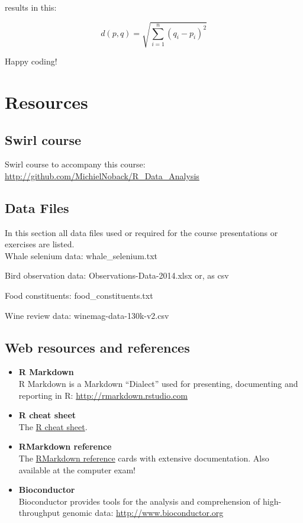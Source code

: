 \documentclass[]{book}
\begin{document}
results in this:

\[d(p, q) = \sqrt{\sum_{i = 1}^{n}(q_i-p_i)^2}\]

Happy coding!

\hypertarget{resources}{%
\section{Resources}\label{resources}}

\hypertarget{swirl-course}{%
\subsection{Swirl course}\label{swirl-course}}

Swirl course to accompany this course: \url{http://github.com/MichielNoback/R_Data_Analysis}

\hypertarget{data-files}{%
\subsection{Data Files}\label{data-files}}

In this section all data files used or required for the course presentations or exercises are listed.\\

Whale selenium data:
whale\_selenium.txt

Bird observation data:
Observations-Data-2014.xlsx or, as
csv

Food constituents:
food\_constituents.txt

Wine review data:
winemag-data-130k-v2.csv

\hypertarget{web-resources-and-references}{%
\subsection{Web resources and references}\label{web-resources-and-references}}

\begin{itemize}
\item
  \textbf{R Markdown}\\
  R Markdown is a Markdown ``Dialect'' used for presenting, documenting and reporting in R: \href{http://rmarkdown.rstudio.com/}{http://rmarkdown.rstudio.com}
\item
  \textbf{R cheat sheet}\\
  The \href{figures/R_cheatsheet.pdf}{R cheat sheet}.
\item
  \textbf{RMarkdown reference}\\
  The \href{https://www.rstudio.com/wp-content/uploads/2015/03/rmarkdown-reference.pdf}{RMarkdown reference} cards with extensive documentation. Also available at the computer exam!
\item
  \textbf{Bioconductor}\\
  Bioconductor provides tools for the analysis and comprehension of high- throughput genomic data: \href{http://www.bioconductor.org/}{http://www.bioconductor.org}
\end{itemize}
\end{document}

